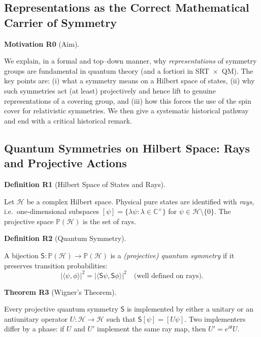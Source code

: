 \documentclass[10pt, letterpaper]{article}
\newcommand{\C}{\mathbb{C}}
\newcommand{\CustomHeading}[3]{%
  \par\medskip\noindent%
  \textbf{#1 #2} \textnormal{(#3)}.\enskip%
}
\newenvironment{DEF}[2]{\begin{unitbox}\CustomHeading{Definition}{#1}{#2}}{\end{unitbox}}
\newenvironment{THEO}[2]{\begin{unitbox}\CustomHeading{Theorem}{#1}{#2}}{\end{unitbox}}
\newenvironment{MOT}[2]{\begin{unitbox}\CustomHeading{Motivation}{#1}{#2}}{\end{unitbox}}
\begin{document}
\pagebreak


\subsection{Representations as the Correct Mathematical Carrier of Symmetry}

\begin{MOT}{R0}{Aim}
We explain, in a formal and top--down manner, why \emph{representations} of symmetry groups are fundamental in quantum theory (and a fortiori in SRT~$\times$~QM).  
The key points are: (i) what a symmetry means on a Hilbert space of states, (ii) why such symmetries act (at least) projectively and hence lift to genuine representations of a covering group, and (iii) how this forces the use of the spin cover for relativistic symmetries. We then give a systematic historical pathway and end with a critical historical remark.
\end{MOT}

\subsection{Quantum Symmetries on Hilbert Space: Rays and Projective Actions}

\begin{DEF}{R1}{Hilbert Space of States and Rays}
Let $\mathcal H$ be a complex Hilbert space. Physical pure states are identified with \emph{rays}, i.e.\ one-dimensional subspaces $[\psi]=\{\lambda\psi:\lambda\in\C^\times\}$ for $\psi\in\mathcal H\setminus\{0\}$. The projective space $\mathbb P(\mathcal H)$ is the set of rays.
\end{DEF}

\begin{DEF}{R2}{Quantum Symmetry}
A bijection $\mathsf S:\mathbb P(\mathcal H)\to\mathbb P(\mathcal H)$ is a \emph{(projective) quantum symmetry} if it preserves transition probabilities:
\[
\big|\langle \psi,\phi\rangle\big|^2 = \big|\langle \mathsf S\psi,\mathsf S\phi\rangle\big|^2
\quad\text{(well defined on rays).}
\]
\end{DEF}

\begin{THEO}{R3}{Wigner’s Theorem}
Every projective quantum symmetry $\mathsf S$ is implemented by either a unitary or an antiunitary operator $U:\mathcal H\to\mathcal H$ such that $\mathsf S[\psi]=[U\psi]$. Two implementers differ by a phase: if $U$ and $U'$ implement the same ray map, then $U'=e^{i\theta}U$.
\end{THEO}
\end{document}
